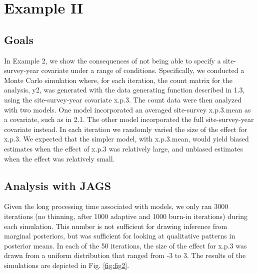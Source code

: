 \documentclass[article]{jss}
\begin{document}
\section[Example II]{Example II}
\subsection[Goals]{Goals}
In Example 2, we show the consequences of not being able to specify a site-survey-year covariate under a range of conditions. Specifically, we conducted a Monte Carlo simulation where, for each iteration, the count matrix for the analysis, y2, was generated with the data generating function described in 1.3, using the site-survey-year covariate x.p.3. The count data were then analyzed with two  models. One model incorporated an averaged site-survey x.p.3.mean as a covariate, such as in 2.1. The other model incorporated the full site-survey-year covariate instead. In each iteration we randomly varied the size of the effect for x.p.3. We expected that the simpler model, with x.p.3.mean, would yield biased estimates when the effect of x.p.3 was relatively large, and unbiased estimates when the effect was relatively small.

\subsection[Analysis with JAGS]{Analysis with JAGS}
Given the long processing time associated with  models, we only ran 3000 iterations (no thinning, after 1000 adaptive and 1000 burn-in iterations) during each simulation. This number is not sufficient for drawing inference from marginal posteriors, but was sufficient for looking at qualitative patterns in posterior means. In each of the 50 iterations, the size of the effect for x.p.3 was drawn from a uniform distribution that ranged from -3 to 3. The results of the simulations are depicted in Fig. \ref{fig:fig2}.
\end{document}
